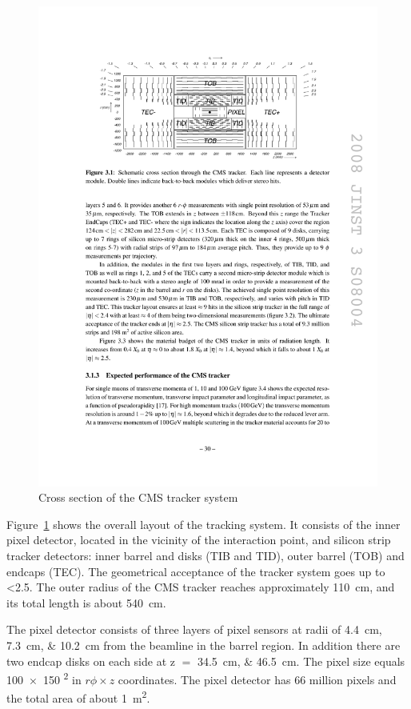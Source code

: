 \begin{figure}[htbp]
  \centering
  \leavevmode
  \includegraphics[width=\columnwidth]{tracker}
  \caption[Cross section of the CMS tracker system]{Cross section of the CMS tracker system \autocite{CMS}}
  \label{fig:tracker}
\end{figure}

Figure~\ref{fig:tracker} shows the overall layout of the tracking system. It consists of the inner pixel detector,
located in the vicinity of the interaction point, and silicon strip tracker detectors: inner barrel and disks (TIB and
TID), outer barrel (TOB) and endcaps (TEC). The geometrical acceptance of the tracker system goes up to \abs\eta
\num{<2.5}. The outer radius of the CMS tracker reaches approximately \SI{110}{\cm}, and its total length is about
\SI{540}{\cm}.

The pixel detector consists of three layers of pixel sensors at radii of \SIlist{4.4;7.3;10.2}{\cm} from the beamline in
the barrel region. In addition there are two endcap disks on each side at \abs z $=$ \SIlist{34.5;46.5}{\cm}. The pixel
size equals \num{100x150} \si{\micron\squared} in $r \phi \times z$ coordinates. The pixel detector has 66 million
pixels and the total area of about \SI{1}{\m\squared}.

